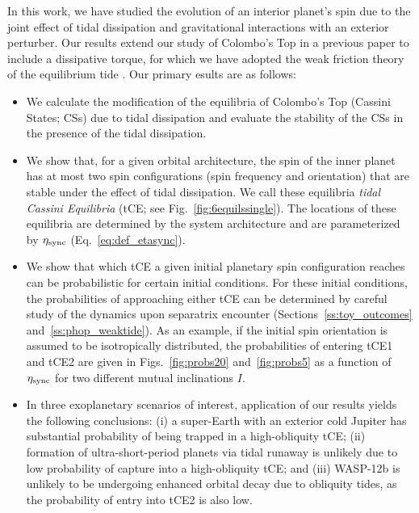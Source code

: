 \documentclass[
        fleqn,
        usenatbib,
    ]{mnras}
\begin{document}
In this work, we have studied the evolution of an interior planet's spin due to
the joint effect of tidal dissipation and gravitational interactions with an
exterior perturber. Our results extend our study of Colombo's Top in a previous
paper \citep{su2020} to include a dissipative torque, for which we have adopted
the weak friction theory of the equilibrium tide \citep{lai2012}. Our primary
esults are as follows:
\begin{itemize}
    \item We calculate the modification of the equilibria of Colombo's Top
        (Cassini States; CSs) due to tidal dissipation and evaluate the
        stability of the CSs in the presence of the tidal dissipation.

    \item We show that, for a given orbital architecture, the spin of the inner
        planet has at most two spin configurations (spin frequency and
        orientation) that are stable under the effect of tidal dissipation. We
        call these equilibria \emph{tidal Cassini Equilibria} (tCE\@; see
        Fig.~\ref{fig:6equilssingle}). The locations of these equilibria are
        determined by the system architecture and are parameterized by
        $\eta_{\rm sync}$ (Eq.~\ref{eq:def_etasync}).

    \item We show that which tCE a given initial planetary spin configuration
        reaches can be probabilistic for certain initial conditions. For these
        initial conditions, the probabilities of approaching either tCE can be
        determined by careful study of the dynamics upon separatrix encounter
        (Sections~\ref{ss:toy_outcomes} and~\ref{ss:phop_weaktide}). As an
        example, if the initial spin orientation is assumed to be isotropically
        distributed, the probabilities of entering tCE1 and tCE2 are given in
        Figs.~\ref{fig:probs20} and~\ref{fig:probs5} as a function of $\eta_{\rm
        sync}$ for two different mutual inclinations $I$.

    \item In three exoplanetary scenarios of interest, application of our
        results yields the following conclusions: (i) a super-Earth with an
        exterior cold Jupiter has substantial probability of being trapped in a
        high-obliquity tCE\@; (ii) formation of ultra-short-period planets via
        tidal runaway is unlikely due to low probability of capture into a
        high-obliquity tCE\@; and (iii) WASP-12b is unlikely to be undergoing
        enhanced orbital decay due to obliquity tides, as the probability of
        entry into tCE2 is also low.
\end{itemize}
\end{document}

